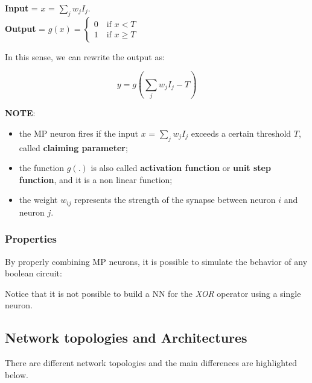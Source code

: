

\textbf{Input} = $x$ = $\sum_j w_jI_j$. \\
\textbf{Output} = $g(x) = \begin{cases}
0 \quad \text{if }x<T\\
1 \quad \text{if }x \geq T
\end{cases}$

In this sense, we can rewrite the output as:

$$
y = g\left(\sum_j w_jI_j - T\right) 
$$

\textbf{NOTE}:

\begin{itemize}
    \item the MP neuron fires if the input $x$ = $\sum_j w_jI_j$ exceeds a certain threshold $T$, called \textbf{claiming parameter};

    \item the function $g(.)$ is also called \textbf{activation function} or \textbf{unit step function}, and it is a non linear function;

    \item the weight $w_{ij}$ represents the strength of the synapse between neuron $i$ and neuron $j$. 
\end{itemize}

\subsubsection{Properties}

By properly combining MP neurons, it is possible to simulate the behavior of any boolean circuit:


Notice that it is not possible to build a NN for the \textit{XOR} operator using a single neuron.

\subsection{Network topologies and Architectures} There are different network topologies and the main differences are highlighted below.

